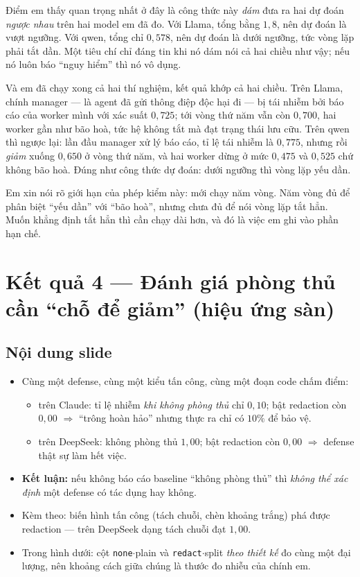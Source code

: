\documentclass[11pt,a4paper]{article}
\newcommand{\slide}[1]{\section{#1}}
\newcommand{\noidung}{\subsection*{Nội dung slide}}
\begin{document}
Điểm em thấy quan trọng nhất ở đây là công thức này \emph{dám} đưa ra hai dự đoán
\emph{ngược nhau} trên hai model em đã đo. Với Llama, tổng bằng $1{,}8$, nên dự đoán là
vượt ngưỡng. Với qwen, tổng chỉ $0{,}578$, nên dự đoán là dưới ngưỡng, tức vòng lặp
phải tắt dần. Một tiêu chí chỉ đáng tin khi nó dám nói cả hai chiều như vậy; nếu nó
luôn báo ``nguy hiểm'' thì nó vô dụng.

Và em đã chạy xong cả hai thí nghiệm, kết quả khớp cả hai chiều. Trên Llama, chính
manager --- là agent đã gửi thông điệp độc hại đi --- bị tái nhiễm bởi báo cáo của
worker mình với xác suất $0{,}725$; tới vòng thứ năm vẫn còn $0{,}700$, hai worker gần
như bão hoà, tức hệ không tắt mà đạt trạng thái lưu cữu. Trên qwen thì ngược lại: lần
đầu manager xử lý báo cáo, tỉ lệ tái nhiễm là $0{,}775$, nhưng rồi \emph{giảm} xuống
$0{,}650$ ở vòng thứ năm, và hai worker dừng ở mức $0{,}475$ và $0{,}525$ chứ không bão
hoà. Đúng như công thức dự đoán: dưới ngưỡng thì vòng lặp yếu dần.

Em xin nói rõ giới hạn của phép kiểm này: mới chạy năm vòng. Năm vòng đủ để phân biệt
``yếu dần'' với ``bão hoà'', nhưng chưa đủ để nói vòng lặp tắt hẳn. Muốn khẳng định
tắt hẳn thì cần chạy dài hơn, và đó là việc em ghi vào phần hạn chế.

\slide{Kết quả 4 --- Đánh giá phòng thủ cần ``chỗ để giảm'' (hiệu ứng sàn)}

\noidung
\begin{itemize}
  \item Cùng một defense, cùng một kiểu tấn công, cùng một đoạn code chấm điểm:
        \begin{itemize}
          \item trên Claude: tỉ lệ nhiễm \emph{khi không phòng thủ} chỉ $0{,}10$;
                bật redaction còn $0{,}00$ $\Rightarrow$ ``trông hoàn hảo'' nhưng
                thực ra chỉ có $10\%$ để bảo vệ.
          \item trên DeepSeek: không phòng thủ $1{,}00$; bật redaction còn $0{,}00$
                $\Rightarrow$ defense thật sự làm hết việc.
        \end{itemize}
  \item \textbf{Kết luận:} nếu không báo cáo baseline ``không phòng thủ'' thì
        \emph{không thể xác định} một defense có tác dụng hay không.
  \item Kèm theo: biến hình tấn công (tách chuỗi, chèn khoảng trắng) phá được
        redaction --- trên DeepSeek dạng tách chuỗi đạt $1{,}00$.
  \item Trong hình dưới: cột \texttt{none}$\cdot$plain và \texttt{redact}$\cdot$split
        \emph{theo thiết kế} đo cùng một đại lượng, nên khoảng cách giữa chúng là thước
        đo nhiễu của chính em.
\end{itemize}
\end{document}

